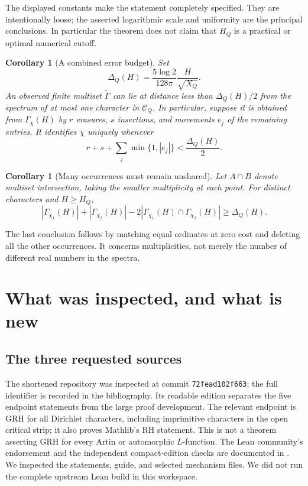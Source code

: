 \documentclass[11pt,letterpaper]{article}
\newtheorem{corollary}[theorem]{Corollary}
\theoremstyle{definition}\newtheorem{definition}[theorem]{Definition}
\theoremstyle{remark}\newtheorem{remark}[theorem]{Remark}
\newcommand{\Ccal}{\mathcal C}
\begin{document}
The displayed constants make the statement completely specified. They
are intentionally loose; the asserted logarithmic scale and uniformity
are the principal conclusions. In particular the theorem does not claim
that $H_Q$ is a practical or optimal numerical cutoff.

\begin{corollary}[A combined error budget]\label{cor:recovery}
Set
\[
 \Delta_Q(H)=\frac{5\log2}{128\pi}\frac H{\sqrt{X_Q}}.
\]
An observed finite multiset $\widetilde\Gamma$ can lie at distance less
than $\Delta_Q(H)/2$ from the spectrum of at most one character in
$\Ccal_Q$. In particular, suppose it is obtained from
$\Gamma_\chi(H)$ by $r$ erasures, $s$ insertions, and movements $e_j$ of
the remaining entries. It identifies $\chi$ uniquely whenever
\begin{equation}\label{eq:corruption-budget}
 r+s+\sum_j\min\{1,|e_j|\}<\frac{\Delta_Q(H)}2.
\end{equation}
\end{corollary}

\begin{corollary}[Many occurrences must remain unshared]\label{cor:unshared}
Let $A\cap B$ denote multiset intersection, taking the smaller
multiplicity at each point. For distinct characters and $H\ge H_Q$,
\[
 |\Gamma_{\chi_1}(H)|+|\Gamma_{\chi_2}(H)|
 -2|\Gamma_{\chi_1}(H)\cap\Gamma_{\chi_2}(H)|\ge\Delta_Q(H).
\]
\end{corollary}

The last conclusion follows by matching equal ordinates at zero cost
and deleting all the other occurrences. It concerns multiplicities,
not merely the number of different real numbers in the spectra.

\section{What was inspected, and what is new}

\subsection{The three requested sources}

The shortened repository \cite{sernau} was inspected at commit
\texttt{72fead102f663}; the full identifier is recorded in the bibliography.
Its readable edition separates the five endpoint statements from the
large proof development. The relevant endpoint is GRH for all Dirichlet
characters, including imprimitive characters in the open critical strip;
it also proves Mathlib's RH statement. This is not a theorem asserting
GRH for every Artin or automorphic $L$-function.
The Lean community's endorsement and the independent compact-edition
checks are documented in \cite{leancommunity,rubinstein}. We inspected
the statements, guide, and selected mechanism files. We did not run the
complete upstream Lean build in this workspace.
\end{document}
